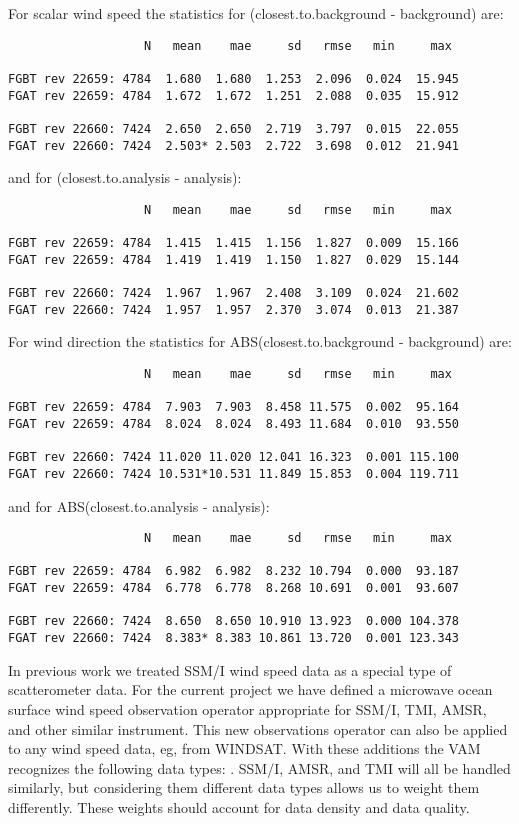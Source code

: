 \documentclass[12pt,titlepage]{article}
\begin{document}
For scalar wind speed the statistics for
(closest.to.background - background) are:
\begin{verbatim}
                   N   mean    mae     sd   rmse   min     max

FGBT rev 22659: 4784  1.680  1.680  1.253  2.096  0.024  15.945
FGAT rev 22659: 4784  1.672  1.672  1.251  2.088  0.035  15.912

FGBT rev 22660: 7424  2.650  2.650  2.719  3.797  0.015  22.055
FGAT rev 22660: 7424  2.503* 2.503  2.722  3.698  0.012  21.941
\end{verbatim}
and for (closest.to.analysis - analysis):
\begin{verbatim}
                   N   mean    mae     sd   rmse   min     max

FGBT rev 22659: 4784  1.415  1.415  1.156  1.827  0.009  15.166
FGAT rev 22659: 4784  1.419  1.419  1.150  1.827  0.029  15.144

FGBT rev 22660: 7424  1.967  1.967  2.408  3.109  0.024  21.602
FGAT rev 22660: 7424  1.957  1.957  2.370  3.074  0.013  21.387
\end{verbatim}
For wind direction the statistics for
ABS(closest.to.background - background) are:
\begin{verbatim}
                   N   mean    mae     sd   rmse   min     max

FGBT rev 22659: 4784  7.903  7.903  8.458 11.575  0.002  95.164
FGAT rev 22659: 4784  8.024  8.024  8.493 11.684  0.010  93.550

FGBT rev 22660: 7424 11.020 11.020 12.041 16.323  0.001 115.100
FGAT rev 22660: 7424 10.531*10.531 11.849 15.853  0.004 119.711
\end{verbatim}
and for ABS(closest.to.analysis - analysis):
\begin{verbatim}
                   N   mean    mae     sd   rmse   min     max

FGBT rev 22659: 4784  6.982  6.982  8.232 10.794  0.000  93.187
FGAT rev 22659: 4784  6.778  6.778  8.268 10.691  0.001  93.607

FGBT rev 22660: 7424  8.650  8.650 10.910 13.923  0.000 104.378
FGAT rev 22660: 7424  8.383* 8.383 10.861 13.720  0.001 123.343
\end{verbatim}


In previous work we treated SSM/I wind speed data as a special type
of scatterometer data.
For the current project we have defined a microwave ocean surface wind speed
observation operator appropriate for SSM/I, TMI, AMSR, and other
similar instrument.
This new observations operator can also be applied to any wind speed
data, eg, from WINDSAT.
With these additions the VAM recognizes the following data types:
.
SSM/I, AMSR, and TMI will all be handled similarly, but considering
them different data types allows us to weight them differently.
These weights should account for data density and data quality.
\end{document}
